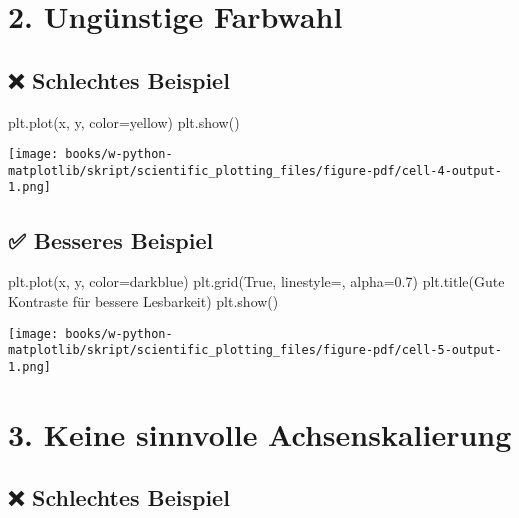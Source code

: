 \documentclass[
  letterpaper,
  DIV=11,
  numbers=noendperiod]{scrreprt}
\newenvironment{Shaded}{\begin{snugshade}}{\end{snugshade}}
\newcommand{\FloatTok}[1]{\textcolor[rgb]{0.68,0.00,0.00}{#1}}
\newcommand{\NormalTok}[1]{\textcolor[rgb]{0.00,0.23,0.31}{#1}}
\newcommand{\OperatorTok}[1]{\textcolor[rgb]{0.37,0.37,0.37}{#1}}
\newcommand{\StringTok}[1]{\textcolor[rgb]{0.13,0.47,0.30}{#1}}
\newcommand{\VariableTok}[1]{\textcolor[rgb]{0.07,0.07,0.07}{#1}}
\begin{document}
\begin{tcolorbox}
\section{2. Ungünstige Farbwahl}\label{unguxfcnstige-farbwahl}

\subsection{❌ Schlechtes Beispiel}\label{schlechtes-beispiel-1}

\begin{Shaded}
\begin{Highlighting}[]
\NormalTok{plt.plot(x, y, color}\OperatorTok{=}\StringTok{\textquotesingle{}yellow\textquotesingle{}}\NormalTok{)}
\NormalTok{plt.show()}
\end{Highlighting}
\end{Shaded}

\texttt{[image: books/w-python-matplotlib/skript/scientific\_plotting\_files/figure-pdf/cell-4-output-1.png]}

\subsection{✅ Besseres Beispiel}\label{besseres-beispiel-1}

\begin{Shaded}
\begin{Highlighting}[]
\NormalTok{plt.plot(x, y, color}\OperatorTok{=}\StringTok{\textquotesingle{}darkblue\textquotesingle{}}\NormalTok{)}
\NormalTok{plt.grid(}\VariableTok{True}\NormalTok{, linestyle}\OperatorTok{=}\StringTok{\textquotesingle{}{-}{-}\textquotesingle{}}\NormalTok{, alpha}\OperatorTok{=}\FloatTok{0.7}\NormalTok{)}
\NormalTok{plt.title(}\StringTok{\textquotesingle{}Gute Kontraste für bessere Lesbarkeit\textquotesingle{}}\NormalTok{)}
\NormalTok{plt.show()}
\end{Highlighting}
\end{Shaded}

\texttt{[image: books/w-python-matplotlib/skript/scientific\_plotting\_files/figure-pdf/cell-5-output-1.png]}

\section{3. Keine sinnvolle
Achsenskalierung}\label{keine-sinnvolle-achsenskalierung}

\subsection{❌ Schlechtes Beispiel}\label{schlechtes-beispiel-2}


\end{tcolorbox}
\end{document}
